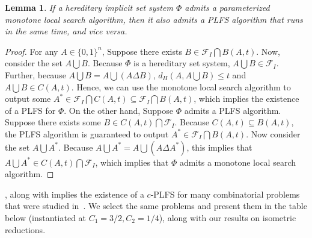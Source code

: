 \documentclass[11pt, letterpaper]{article}
\newtheorem{lemma}[theorem]{Lemma}
\theoremstyle{definition}
\newcommand{\Q}[1]{\{0,1\}^{#1}}
\newcommand{\calf}{\mathcal{F}}
\begin{document}
\begin{lemma} \label{lem:heriditary}
    If a hereditary implicit set system $\Phi$ admits a parameterized monotone local search algorithm, then it also admits a PLFS algorithm that runs in the same time, and vice versa. 
\end{lemma}
\begin{proof}
    For any $A \in \Q{n}$, Suppose there exists $B \in \mathcal{F}_I \bigcap B(A,t)$. Now, consider the set $A \bigcup B$. Because $\Phi$ is a hereditary set system, $A \bigcup B \in \mathcal{F}_I$. Further, because $A \bigcup B=A \bigcup (A \Delta B)$, $d_H(A,A \bigcup B) \leq t$ and $A \bigcup B \in C(A,t)$. Hence, we can use the monotone local search algorithm to output some $A^* \in \mathcal{F}_I \bigcap C(A,t) \subseteq \mathcal{F}_I \bigcap B(A,t)$, which implies the existence of a PLFS for $\Phi$. On the other hand, Suppose $\Phi$ admits a PLFS algorithm. Suppose there exists some $B \in C(A,t) \bigcap \calf_I$. Because $C(A,t) \subseteq B(A,t)$, the PLFS algorithm is guaranteed to output $A^* \in \calf_I \bigcap B(A,t)$. Now consider the set $A \bigcup A^*$. Because $A \bigcup A^*=A \bigcup (A \Delta A^*)$, this implies that $A \bigcup A^* \in C(A,t) \bigcap \calf_I$, which implies that $\Phi$ admits a monotone local search algorithm. 
\end{proof}
, along with  implies the existence of a $c$-PLFS for many combinatorial problems that were studied in~\cite{ConicSearch}. We select the same problems and present them in the table below (instantiated at $C_1=3/2, C_2=1/4$), along with our results on isometric reductions.
\end{document}
